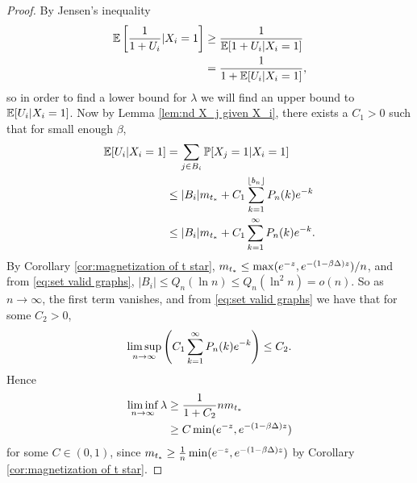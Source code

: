 \begin{proof}
		By Jensen's inequality
		\begin{align}
			\mathbb{E} \left[\frac{1}{1 + U_i}| X_i = 1\right] &\geq \frac{1}{\mathbb{E}[1 + U_i | X_i = 1]}\\
				&= \frac{1}{1 + \mathbb{E}[U_i | X_i = 1]},
		\end{align}
		so in order to find a lower bound for $\lambda$ we will find an upper bound to $\mathbb{E}[U_i | X_i = 1]$. Now by Lemma \ref{lem:nd X_j given X_i}, there exists a $C_1>0$ such that for small enough $\beta$,
		\begin{align}
			\mathbb{E}[U_i | X_i = 1] &= \sum_{j \in B_i} \mathbb{P}[X_j = 1| X_i = 1]\\
				&\leq |B_i|m_{t_*} + C_1 \sum_{k=1}^{\lfloor b_n \rfloor} P_n(k) e^{-k}\\
				&\leq |B_i|m_{t_*} + C_1 \sum_{k=1}^{\infty} P_n(k) e^{-k}.
		\end{align}
		By Corollary \ref{cor:magnetization of t star}, $m_{t_*} \leq \max(e^{-z}, e^{-(1 - \beta\Delta)z})/n$, and from \eqref{eq:set valid graphs}, $|B_i| \leq Q_n(\ln n) \leq Q_n (\ln^2 n) = o(n)$.
		So as $n \rightarrow \infty$, the first term vanishes, and from \eqref{eq:set valid graphs} we have that for some $C_2 > 0$,
		\begin{equation}
			 \limsup_{n \rightarrow \infty} \left(C_1 \sum_{k=1}^\infty P_n(k) e^{-k} \right)\leq C_2.
		\end{equation}
		Hence
		\begin{align}
			\liminf_{n \rightarrow \infty} \lambda &\geq \frac{1}{1 + C_2} n m_{t_*}\\
				&\geq C \min(e^{-z}, e^{-(1 - \beta\Delta)z}) 
		\end{align}
		for some $C \in (0, 1)$, since $m_{t_*} \geq \frac{1}{n}\min(e^{-z}, e^{-(1 - \beta\Delta)z})$ by Corollary \ref{cor:magnetization of t star}.
	\end{proof}

